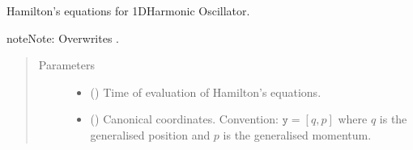 \documentclass[a4paper,landscape,10pt,english]{sphinxmanual}
\begin{document}
\begin{fulllineitems}
\begin{fulllineitems}
\begin{quote}
\begin{description}
\begin{itemize}
\end{itemize}

\end{description}\end{quote}

\end{fulllineitems}


\begin{fulllineitems}
\label{\detokenize{code_docs/simulation_API.simulation:simulation_API.simulation.simulations.HarmonicOsc1D.dyn_sys_eqns}}
Hamilton’s equations for 1D\sphinxhyphen{}Harmonic Oscillator.

\begin{sphinxadmonition}{note}{Note:}
Overwrites {\hyperref[\detokenize{code_docs/simulation_API.simulation:simulation_API.simulation.simulations.Simulation.dyn_sys_eqns}]{}}.
\end{sphinxadmonition}
\begin{quote}\begin{description}
\item[{Parameters}] \leavevmode\begin{itemize}
\item {} 
 () \textendash{} Time of evaluation of Hamilton’s equations.

\item {} 
 (\sphinxstyleliteralemphasis{\sphinxupquote{, }}\sphinxstyleliteralemphasis{\sphinxupquote{ (}}\sphinxstyleliteralemphasis{\sphinxupquote{,}}\sphinxstyleliteralemphasis{\sphinxupquote{)}}) \textendash{} Canonical coordinates.
Convention: \(\texttt{y} = [q, p]\) where \(q\) is the
generalised position and \(p\) is the generalised momentum.


\end{itemize}
\end{description}
\end{quote}
\end{fulllineitems}
\end{fulllineitems}
\end{document}
